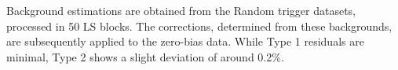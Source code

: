 \newpage
Background estimations are obtained from the Random trigger datasets, processed in 50 LS blocks. The corrections, determined from these backgrounds, are subsequently applied to the zero-bias data. %
While Type 1 residuals are minimal, Type 2 shows a slight deviation of around 0.2\%.

